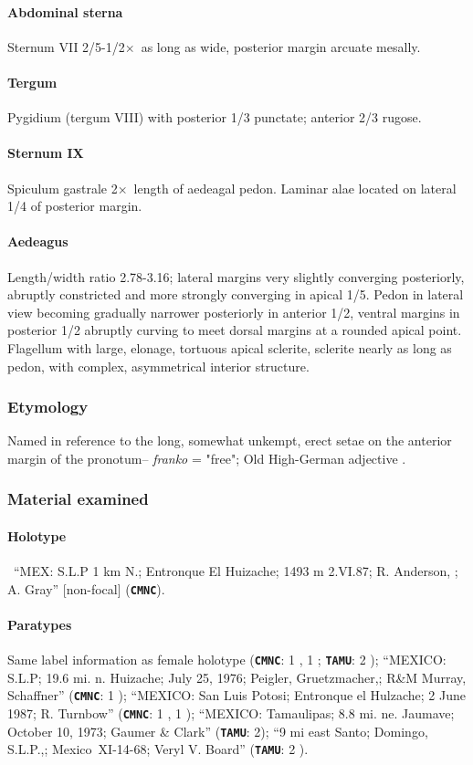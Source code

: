 \documentclass[fleqn,10pt,lineno]{wlpeerj} %
\newcommand{\x}{$\times$~}
\begin{document}
			\paragraph{Abdominal sterna}
				Sternum VII 2/5-1/2\x as long as wide, posterior margin arcuate mesally.
			\paragraph{Tergum}
				Pygidium (tergum VIII) with posterior 1/3 punctate; anterior 2/3 rugose.
			\paragraph{Sternum IX}
				Spiculum gastrale 2\x length of aedeagal pedon. Laminar alae located on lateral 1/4 of posterior margin.
			\paragraph{Aedeagus}
				Length/width ratio 2.78-3.16; lateral margins very slightly converging posteriorly, abruptly constricted and more strongly converging in apical 1/5.
				Pedon in lateral view becoming gradually narrower posteriorly in anterior 1/2, ventral margins in posterior 1/2 abruptly curving to meet dorsal margins at a rounded apical point.
				Flagellum with large, elonage, tortuous apical sclerite, sclerite nearly as long as pedon, with complex, asymmetrical interior structure.
		\subsubsection*{Etymology}
			Named in reference to the long, somewhat unkempt, erect setae on the anterior margin of the pronotum-- \textit{franko} = "free"; Old High-German adjective \citep{brown1956}.
		\subsubsection*{Material examined}
			\paragraph{Holotype}
				\female~``MEX: S.L.P 1 km N.; Entronque El Huizache; 1493 m 2.VI.87; R. Anderson, \underline{}; \underline{} A. Gray'' [non-focal] (\texttt{\textbf{CMNC}}).
			\paragraph{Paratypes}
				Same label information as female holotype (\texttt{\textbf{CMNC}}:  1 \female, 1 \male; \texttt{\textbf{TAMU}}: 2 \male);
				``MEXICO: S.L.P; 19.6 mi. n. Huizache; July 25, 1976; Peigler, Gruetzmacher,; R\&M Murray, Schaffner'' (\texttt{\textbf{CMNC}}: 1 \male);
				``MEXICO: San Luis Potosi; Entronque el Hulzache; 2 June 1987; R. Turnbow'' (\texttt{\textbf{CMNC}}: 1 \female, 1 \male);
				``MEXICO: Tamaulipas; 8.8 mi. ne. Jaumave; October 10, 1973; Gaumer \& Clark'' (\texttt{\textbf{TAMU}}: 2\female);
				``9 mi east Santo; Domingo, S.L.P.,; Mexico~XI-14-68; Veryl V. Board'' (\texttt{\textbf{TAMU}}: 2 \male).
\end{document}

